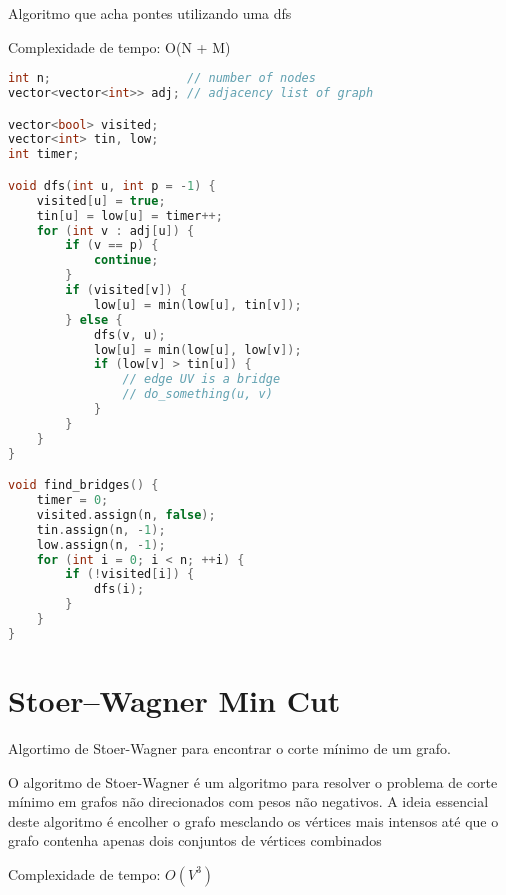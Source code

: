 \documentclass[11pt, a4paper, oneside]{book}
\begin{document}
Algoritmo que acha pontes utilizando uma dfs



Complexidade de tempo: O(N + M)
\hfill

\begin{multicols}{2}
\begin{lstlisting}[language=C++]
int n;                   // number of nodes
vector<vector<int>> adj; // adjacency list of graph

vector<bool> visited;
vector<int> tin, low;
int timer;

void dfs(int u, int p = -1) {
    visited[u] = true;
    tin[u] = low[u] = timer++;
    for (int v : adj[u]) {
        if (v == p) {
            continue;
        }
        if (visited[v]) {
            low[u] = min(low[u], tin[v]);
        } else {
            dfs(v, u);
            low[u] = min(low[u], low[v]);
            if (low[v] > tin[u]) {
                // edge UV is a bridge
                // do_something(u, v)
            }
        }
    }
}

void find_bridges() {
    timer = 0;
    visited.assign(n, false);
    tin.assign(n, -1);
    low.assign(n, -1);
    for (int i = 0; i < n; ++i) {
        if (!visited[i]) {
            dfs(i);
        }
    }
}
\end{lstlisting}
\end{multicols}

\hfill

\section{Stoer–Wagner Min Cut}


Algortimo de Stoer-Wagner para encontrar o corte mínimo de um grafo.



O algoritmo de Stoer-Wagner é um algoritmo para resolver o problema de corte mínimo em grafos não direcionados com pesos não negativos. A ideia essencial deste algoritmo é encolher o grafo mesclando os vértices mais intensos até que o grafo contenha apenas dois conjuntos de vértices combinados



Complexidade de tempo: $O(V^3)$

\hfill
\end{document}
